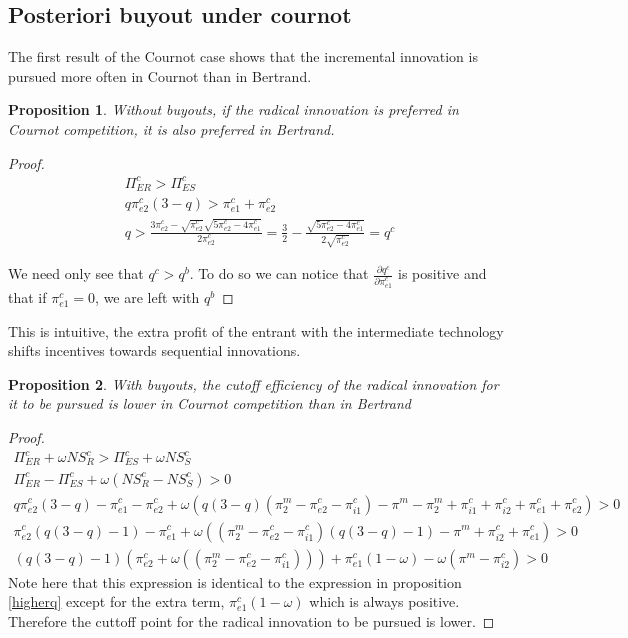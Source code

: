 \documentclass[11pt]{article}
\newtheorem{proposition}{Proposition}
\begin{document}
\subsection*{Posteriori buyout under cournot}

The first result of the Cournot case shows that the incremental innovation is pursued more often in Cournot than in Bertrand. 

\begin{proposition}
Without buyouts, if the radical innovation is preferred in Cournot competition, it is also preferred in Bertrand. 
\end{proposition}

\begin{proof}
\begin{align*}
\Pi_{ER}^{c}>\Pi_{ES}^{c} \\
q \pi_{e2}^{c} (3-q) > \pi_{e1}^{c}+\pi_{e2}^{c} \\
q> 
\frac{3 \pi_{e2}^{c}-\sqrt{\pi_{e2}^{c}} \sqrt{5 \pi_{e2}^{c}-4 \pi_{e1}^{c}}}{2 \pi_{e2}^{c}} 
= \frac{3}{2}-\frac{ \sqrt{5 \pi_{e2}^{c}-4 \pi_{e1}^{c}}}{2 \sqrt{\pi_{e2}^{c}}}=q^{c}
\end{align*}

We need only see that $q^{c}>q^{b}$. To do so we can notice that $\frac{\partial q^c}{\partial \pi_{e1}^{c} }$ is positive and that if $\pi_{e1}^{c}=0$, we are left with $q^{b}$
\end{proof}

This is intuitive, the extra profit of the entrant with the intermediate technology shifts incentives towards sequential innovations. 

\begin{proposition}
With buyouts, the cutoff efficiency of the radical innovation for it to be pursued is lower in Cournot competition than in Bertrand
\end{proposition}

\begin{proof}
\begin{align*}
\Pi_{ER}^{c} + \omega NS_{R}^{c}
> \Pi_{ES}^{c} + \omega NS_{S}^{c} \\
\Pi_{ER}^{c}- \Pi_{ES}^{c}+ \omega (NS_{R}^{c}-NS_{S}^{c})
>  0 \\
q \pi_{e2}^{c} (3-q) - \pi_{e1}^{c}-\pi_{e2}^{c} + \omega(q(3-q) (\pi_{2}^{m}-\pi_{e2}^{c}-\pi_{i1}^{c}) - 
\pi^m 
- \pi^m_{2} 
+ \pi_{i1}^{c}
+\pi_{i2}^{c}
+\pi_{e1}^{c}
+\pi_{e2}^{c}) > 0\\
\pi_{e2}^{c}(q  (3-q)-1) - \pi_{e1}^{c} + \omega((\pi_{2}^{m}-\pi_{e2}^{c}-\pi_{i1}^{c})(q(3-q)-1)  
-\pi^m 
+\pi_{i2}^{c}
+\pi_{e1}^{c}
)> 0 \\
(q  (3-q)-1)(\pi_{e2}^{c}+\omega((\pi_{2}^{m}-\pi_{e2}^{c}-\pi_{i1}^{c})))
+\pi_{e1}^{c}(1-\omega)
-\omega(\pi^m 
-\pi_{i2}^{c})>0
\end{align*} 
Note here that this expression is identical to the expression in proposition \ref{higherq} except for the extra term, $\pi_{e1}^{c}(1-\omega)$ which is always positive. Therefore the cuttoff point for the radical innovation to be pursued is lower. 
\end{proof}
\end{document}
